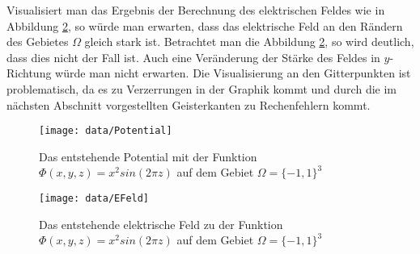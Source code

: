 Visualisiert man das Ergebnis der Berechnung des elektrischen Feldes wie in Abbildung \ref{fig:EFeld}, so würde man erwarten, dass das elektrische Feld an den Rändern des Gebietes $\Omega$ gleich stark ist. Betrachtet man die Abbildung \ref{fig:EFeld}, so wird deutlich, dass dies nicht der Fall ist. Auch eine Veränderung der Stärke des Feldes in $y$-Richtung würde man nicht erwarten. Die Visualisierung an den Gitterpunkten ist problematisch, da es zu Verzerrungen in der Graphik kommt und durch die im nächsten Abschnitt vorgestellten Geisterkanten zu Rechenfehlern kommt.
\begin{figure}[h!] 
	\centering
	\texttt{[image: data/Potential]} 
	\caption{Das entstehende Potential mit der Funktion $\Phi(x,y,z)=x^2sin(2\pi z)$ auf dem Gebiet $\Omega = \{-1,1\}^3$} 
	\label{fig:Pot} 
\end{figure} 
\begin{figure}[h!] 
	\centering
	\texttt{[image: data/EFeld]} 
	\caption{Das entstehende elektrische Feld zu der Funktion $\Phi(x,y,z)=x^2sin(2\pi z)$ auf dem Gebiet $\Omega = \{-1,1\}^3$} 
	\label{fig:EFeld} 
\end{figure} 
 

